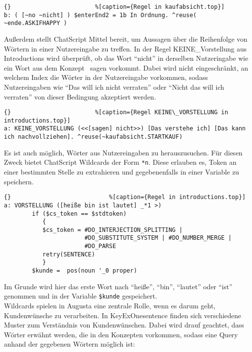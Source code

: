 \begin{lstlisting}{}						%[caption={Regel in kaufabsicht.top}]
b: ( [~no ~nicht] ) $enterEnd2 = 1b In Ordnung. ^reuse( ~ende.ASKIFHAPPY )
\end{lstlisting}

Außerdem stellt ChatScript Mittel bereit, um Aussagen über die Reihenfolge von Wörtern in einer Nutzereingabe zu treffen. In der Regel KEINE\_Vorstellung aus Introductions wird überprüft, ob das Wort "`nicht"' in derselben Nutzeringabe wie ein Wort aus dem Konzept ~sagen vorkommt. Dabei wird nicht eingeschränkt, an welchem Index die Wörter in der Nutzereingabe vorkommen, sodass Nutzereingaben wie "`Das will ich nicht verraten"' oder "`Nicht das will ich verraten"' von dieser Bedingung akzeptiert werden. 

\begin{lstlisting}{}						%[caption={Regel KEINE\_VORSTELLUNG in introductions.top}]
a: KEINE_VORSTELLUNG (<<[sagen] nicht>>) [Das verstehe ich] [Das kann ich nachvollziehen]. ^reuse(~kaufabsicht.STARTKAUF)
\end{lstlisting}

Es ist auch möglich, Wörter aus Nutzereingaben zu herauszusuchen. Für diesen Zweck bietet ChatScript Wildcards der Form \lstinline|*n|. Diese erlauben es, Token an einer bestimmten Stelle zu extrahieren und gegebenenfalls in einer Variable zu speichern. 

\begin{lstlisting}{}							%[caption={Regel in introductions.top}]
a: VORSTELLUNG ([heiße bin ist lautet] _*1 >)
	    if ($cs_token == $stdtoken)
           {
           $cs_token = #DO_INTERJECTION_SPLITTING |
                       #DO_SUBSTITUTE_SYSTEM | #DO_NUMBER_MERGE |
                       #DO_PARSE
           retry(SENTENCE)
           }
        $kunde =  pos(noun '_0 proper)
\end{lstlisting}

Im Grunde wird hier das erste Wort nach "`heiße"', "`bin"', "`lautet"' oder "`ist"' genommen und in der Variable \lstinline|$kunde| gespeichert. \\

Wildcards spielen in Augusta eine zentrale Rolle, wenn es darum geht, Kundenwünsche zu verarbeiten. In KeyExOnesentence finden sich verschiedene Muster zum Verständnis von Kundenwünschen. Dabei wird drauf geachtet, dass Wörter erwähnt werden, die in den Konzepten vorkommen, sodass eine Query anhand der gegebenen Wörtern möglich ist: 

